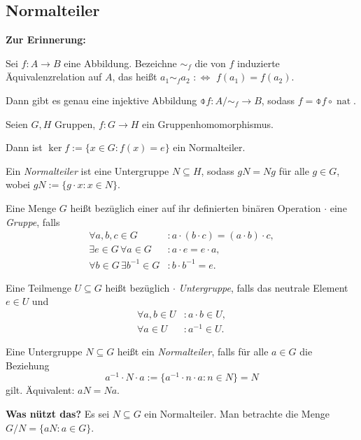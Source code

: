 \subsection{Normalteiler}
\textbf{Zur Erinnerung:}
\begin{thm*}[Abbildungssatz]
 Sei $f:A \to B$ eine Abbildung. Bezeichne $\sim_f$ die von $f$ induzierte Äquivalenzrelation auf $A$, das heißt $a_1 \sim_f a_2$ $:\Leftrightarrow$ $f(a_1) = f(a_2)$.
 
 Dann gibt es genau eine injektive Abbildung $\obar{f}: A/\sim_f \to B$, sodass $f = \obar{f} \circ \operatorname{nat}$.
\end{thm*}

\begin{thm*}[Homomorphiesatz]
 Seien $G,H$ Gruppen, $f:G \to H$ ein Gruppenhomomorphismus.
 
 Dann ist $\ker f := \{ x \in G : f(x) = e \}$ ein Normalteiler.
\end{thm*}

Ein \emph{Normalteiler} ist eine Untergruppe $N \subseteq H$, sodass $gN = Ng$ für alle $g \in G$, wobei $gN := \{ g \cdot x : x \in N \}$.


Eine Menge $G$ heißt bezüglich einer auf ihr definierten binären Operation $\cdot$ eine \emph{Gruppe}, falls
\[ \begin{aligned}
    \forall a,b,c \in G &: a \cdot (b \cdot c ) = (a \cdot b ) \cdot c, \\
    \exists e \in G \, \forall a \in G &: a \cdot e = e \cdot a, \\
    \forall b \in G \, \exists b^{-1} \in G &: b \cdot b^{-1} = e.
   \end{aligned} \]
   
Eine Teilmenge $U \subseteq G$ heißt bezüglich $\cdot$ \emph{Untergruppe}, falls das neutrale Element $e \in U$ und 
\[ \begin{aligned}
    \forall a,b \in U &: a \cdot b \in U, \\
    \forall a \in U &: a^{-1} \in U.
   \end{aligned} \]

Eine Untergruppe $N \subseteq G$ heißt ein \emph{Normalteiler}, falls für alle $a \in G$ die Beziehung 
\[ a^{-1} \cdot N \cdot a := \{ a^{-1} \cdot n \cdot a : n \in N \} = N \]
gilt. Äquivalent: $aN = Na$.

\textbf{Was nützt das?}
Es sei $N \subseteq G$ ein Normalteiler. Man betrachte die Menge $G / N = \{ a N : a \in G \}$.

